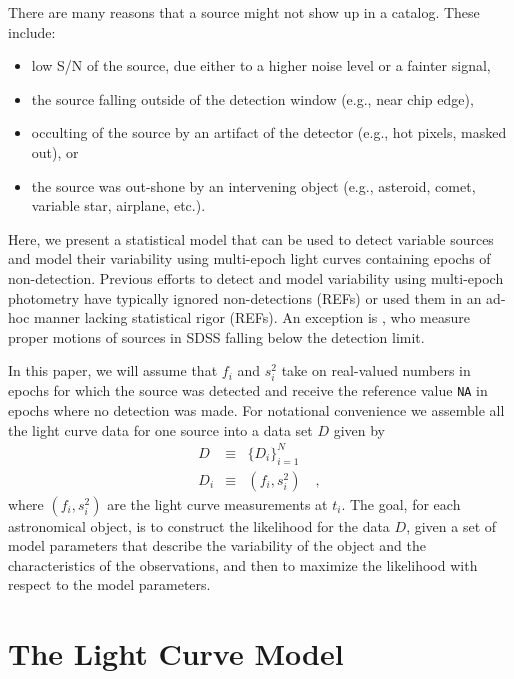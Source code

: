 \documentclass[12pt,preprint]{aastex}
\newcommand{\fobs}{f_i}
\newcommand{\sobs}{s^2_i}
\begin{document}
There are many reasons that a source might not show up in a catalog.  These include:
\begin{itemize}
\item low S/N of the source, due either to a higher noise level or a fainter signal,
\item the source falling outside of the detection window (e.g., near chip edge),
\item occulting of the source by an artifact of the detector (e.g., hot pixels, masked out), or
\item the source was out-shone by an intervening object (e.g., asteroid, comet, variable star, airplane, etc.).
\end{itemize}
Here, we present a statistical model that can be used to detect variable sources and model their variability using multi-epoch light curves containing epochs of non-detection.  Previous efforts to detect and model variability using multi-epoch photometry have typically ignored non-detections (REFs) or used them in an ad-hoc manner lacking statistical rigor (REFs).  An exception is \citet{2009AJ....137.4400L}, who measure proper motions of sources in SDSS falling below the detection limit.


In this paper, we will assume that $\fobs$ and $\sobs$ take on real-valued numbers in epochs for which the source was detected and receive the reference value {\tt NA} in epochs where no detection was made. For notational convenience we assemble all the light curve data for one source into a data set $D$ given by
\begin{eqnarray}\displaystyle
D &\equiv& \{D_i\}_{i=1}^N
\\
D_i &\equiv& (\fobs, \sobs)
\quad ,
\end{eqnarray}
where $(\fobs, \sobs)$ are the light curve measurements  at $t_i$.  The goal, for each astronomical object, is to construct the likelihood for the data $D$, given a set of model parameters that describe the variability of the object and the characteristics of the observations, and then to maximize the likelihood with respect to the model parameters.%


\section{The Light Curve Model}
\label{sec:model}
\end{document}
